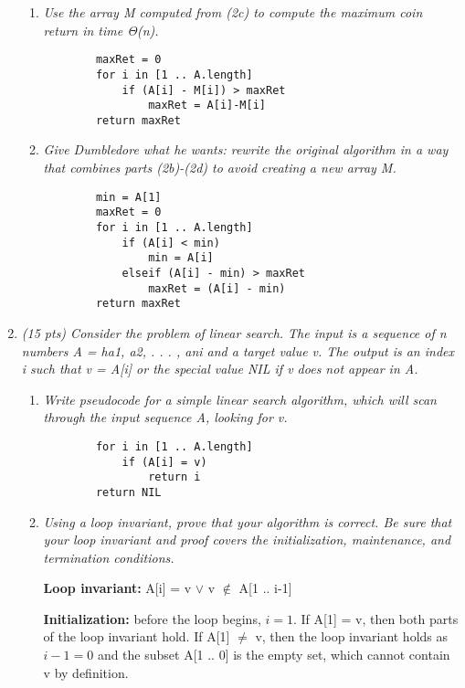 \documentclass[12pt]{article}
\begin{document}
\begin{enumerate}
\begin{enumerate}
		\item \textit{Use the array M computed from (2c) to compute the maximum coin return in time Θ(n).}

		\begin{verbatim}
		maxRet = 0
		for i in [1 .. A.length]
		    if (A[i] - M[i]) > maxRet
		        maxRet = A[i]-M[i]
		return maxRet
		\end{verbatim}


		\item \textit{Give Dumbledore what he wants: rewrite the original algorithm in a way that combines parts (2b)-(2d) to avoid creating a new array M.}

		\begin{verbatim}
		min = A[1]
		maxRet = 0
		for i in [1 .. A.length]
		    if (A[i] < min)
		        min = A[i]
		    elseif (A[i] - min) > maxRet
		        maxRet = (A[i] - min)
		return maxRet
		\end{verbatim}

	\end{enumerate}

	\newpage

	\item \textit{(15 pts) Consider the problem of linear search. The input is a sequence of n numbers A = ha1, a2, . . . , ani and a target value v. The output is an index i such that v = A[i] or the special value NIL if v does not appear in A.}

	\begin{enumerate}

		\item \textit{Write pseudocode for a simple linear search algorithm, which will scan through the input sequence A, looking for v.}

		\begin{verbatim}
		for i in [1 .. A.length]
		    if (A[i] = v)
		        return i
		return NIL
		\end{verbatim}

		\item \textit{Using a loop invariant, prove that your algorithm is correct. Be sure that your loop invariant and proof covers the initialization, maintenance, and termination conditions.} 


		\textbf{Loop invariant:} A[i] = v $\vee$ v $\notin$ A[1 .. i-1]


		\textbf{Initialization:} before the loop begins, $i = 1$. If A[1] = v, then both parts of the loop invariant hold. If A[1] $\neq$ v, then the loop invariant holds as $i - 1 = 0$ and the subset A[1 .. 0] is the empty set, which cannot contain v by definition. 


\end{enumerate}
\end{enumerate}
\end{document}
